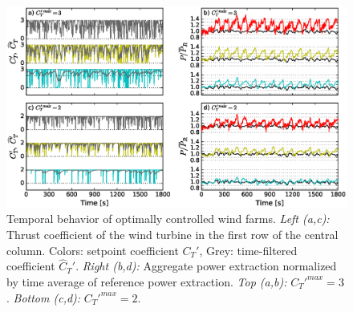 \begin{figure}
	\centering
	\includegraphics[width=0.93\linewidth]{chapters/philtrans_torque/dynamics.eps}
	\caption[Temporal behavior of optimally controlled wind farms.]{Temporal behavior of optimally controlled wind farms. 
		\emph{Left (a,c): } Thrust coefficient of the wind turbine in the first row of the central column. Colors: setpoint coefficient $C_T'$, Grey: time-filtered coefficient $\widehat{C}_T'$. \emph{Right (b,d): } Aggregate power extraction normalized by time average of reference power extraction. \emph{Top (a,b): } $C_T'^{max}=3$. \emph{Bottom (c,d): } $C_T'^{max} = 2$. \legendtauref \label{fig:time_control_and_time_power}}
\end{figure}


